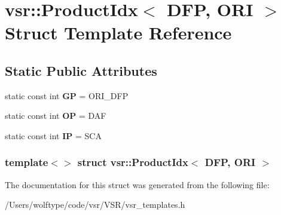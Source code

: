 \hypertarget{structvsr_1_1_product_idx_3_01_d_f_p_00_01_o_r_i_01_4}{\section{vsr\-:\-:Product\-Idx$<$ D\-F\-P, O\-R\-I $>$ Struct Template Reference}
\label{structvsr_1_1_product_idx_3_01_d_f_p_00_01_o_r_i_01_4}
}
\subsection*{Static Public Attributes}
\begin{DoxyCompactItemize}
\item 
\hypertarget{structvsr_1_1_product_idx_3_01_d_f_p_00_01_o_r_i_01_4_a71f6e10718d7d9b735f6e54491b0fefb}{static const int {\bfseries G\-P} = O\-R\-I\-\_\-\-D\-F\-P}\label{structvsr_1_1_product_idx_3_01_d_f_p_00_01_o_r_i_01_4_a71f6e10718d7d9b735f6e54491b0fefb}

\item 
\hypertarget{structvsr_1_1_product_idx_3_01_d_f_p_00_01_o_r_i_01_4_a12e5725f715f7cc68526d96d45826185}{static const int {\bfseries O\-P} = D\-A\-F}\label{structvsr_1_1_product_idx_3_01_d_f_p_00_01_o_r_i_01_4_a12e5725f715f7cc68526d96d45826185}

\item 
\hypertarget{structvsr_1_1_product_idx_3_01_d_f_p_00_01_o_r_i_01_4_af3848964fb498734a50c44faf2b9332b}{static const int {\bfseries I\-P} = S\-C\-A}\label{structvsr_1_1_product_idx_3_01_d_f_p_00_01_o_r_i_01_4_af3848964fb498734a50c44faf2b9332b}

\end{DoxyCompactItemize}
\subsubsection*{template$<$$>$ struct vsr\-::\-Product\-Idx$<$ D\-F\-P, O\-R\-I $>$}



The documentation for this struct was generated from the following file\-:\begin{DoxyCompactItemize}
\item 
/\-Users/wolftype/code/vsr/\-V\-S\-R/vsr\-\_\-templates.\-h\end{DoxyCompactItemize}
